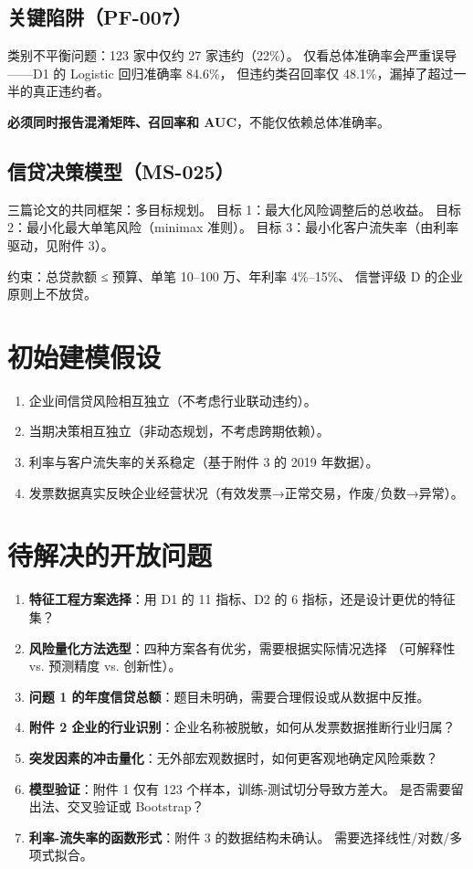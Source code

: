 \documentclass{internal-report}
\begin{document}
\subsection{关键陷阱（PF-007）}

类别不平衡问题：123 家中仅约 27 家违约（22\%）。
仅看总体准确率会严重误导——D1 的 Logistic 回归准确率 84.6\%，
但违约类召回率仅 48.1\%，漏掉了超过一半的真正违约者。

\textbf{必须同时报告混淆矩阵、召回率和 AUC}，不能仅依赖总体准确率。

\subsection{信贷决策模型（MS-025）}

三篇论文的共同框架：多目标规划。
目标 1：最大化风险调整后的总收益。
目标 2：最小化最大单笔风险（minimax 准则）。
目标 3：最小化客户流失率（由利率驱动，见附件 3）。

约束：总贷款额 ≤ 预算、单笔 10--100 万、年利率 4\%--15\%、
信誉评级 D 的企业原则上不放贷。

\section{初始建模假设}

\begin{enumerate}
  \item 企业间信贷风险相互独立（不考虑行业联动违约）。
  \item 当期决策相互独立（非动态规划，不考虑跨期依赖）。
  \item 利率与客户流失率的关系稳定（基于附件 3 的 2019 年数据）。
  \item 发票数据真实反映企业经营状况（有效发票→正常交易，作废/负数→异常）。
\end{enumerate}

\section{待解决的开放问题}

\begin{enumerate}
  \item \textbf{特征工程方案选择}：用 D1 的 11 指标、D2 的 6 指标，还是设计更优的特征集？
  \item \textbf{风险量化方法选型}：四种方案各有优劣，需要根据实际情况选择
    （可解释性 vs. 预测精度 vs. 创新性）。
  \item \textbf{问题 1 的年度信贷总额}：题目未明确，需要合理假设或从数据中反推。
  \item \textbf{附件 2 企业的行业识别}：企业名称被脱敏，如何从发票数据推断行业归属？
  \item \textbf{突发因素的冲击量化}：无外部宏观数据时，如何更客观地确定风险乘数？
  \item \textbf{模型验证}：附件 1 仅有 123 个样本，训练-测试切分导致方差大。
    是否需要留出法、交叉验证或 Bootstrap？
  \item \textbf{利率-流失率的函数形式}：附件 3 的数据结构未确认。
    需要选择线性/对数/多项式拟合。
\end{enumerate}
\end{document}
